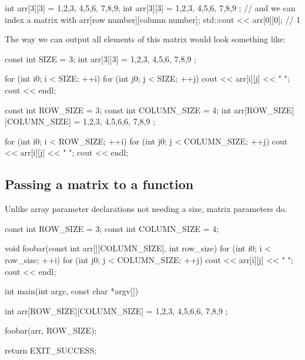 \documentclass{report}
\begin{document}
    \begin{cppcode}
int arr[3][3] = {{1,2,3}, {4,5,6}, {7,8,9}};
int arr[3][3] = {
                {1,2,3},
                {4,5,6},
                {7,8,9}
            };
// and we can index a matrix with
arr[row number][column number];
std::cout << arr[0][0];  // 1
    \end{cppcode}
    \bigbreak \noindent 
    The way we can output all elements of this matrix would look something like:
    \bigbreak \noindent 
    \begin{minipage}[t]{0.47\textwidth}
    \bigbreak \noindent 
    
    \begin{cppcode}

    const int SIZE = 3;
    int arr[3][3] = {
                {1,2,3},
                {4,5,6},
                {7,8,9}
            };

    for (int i{0}; i < SIZE; ++i) {
        for (int j{0}; j < SIZE; ++j) {
            cout << arr[i][j] << " ";
        } 
        cout << endl;
    }
    \end{cppcode}
    \end{minipage}
    \hspace{0.2in} 
    \begin{minipage}[t]{0.47\textwidth}
\bigbreak \noindent 
\begin{cppcode}
    const int ROW_SIZE = 3;
    const int COLUMN_SIZE = 4;
    int arr[ROW_SIZE][COLUMN_SIZE] = {
                {1,2,3},
                {4,5,6,6},
                {7,8,9}
            };

    for (int i{0}; i < ROW_SIZE; ++i) {
        for (int j{0}; j < COLUMN_SIZE; ++j) {
            cout << arr[i][j] << " ";
        } 
        cout << endl;
    }
\end{cppcode}
    \end{minipage}
    \bigbreak \noindent 
    

    \pagebreak \bigbreak \noindent 
    \subsection{Passing a matrix to a function}
    \bigbreak \noindent 
    Unlike array parameter declarations not needing a size, matrix parameters do.
    \bigbreak \noindent 
    
    \begin{cppcode}
const int ROW_SIZE = 3;
const int COLUMN_SIZE = 4;

void foobar(const int arr[][COLUMN_SIZE], int row_size) {
    for (int i{0}; i < row_size; ++i) {
        for (int j{0}; j < COLUMN_SIZE; ++j) {
            cout << arr[i][j] << " ";
        }
        cout << endl;
    }
}

int main(int argc, const char *argv[]) {


    int arr[ROW_SIZE][COLUMN_SIZE] = {
                {1,2,3},
                {4,5,6,6},
                {7,8,9}
            };

    foobar(arr, ROW_SIZE);

    return EXIT_SUCCESS;
}
    \end{cppcode}
    
\end{document}
